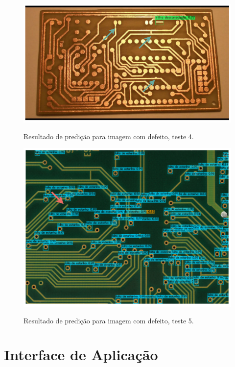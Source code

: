 \begin{figure}[H] %
  \centering
  \caption{Resultado de predição para imagem com defeito, teste 4.}
  \includegraphics[scale=0.95]{img/img-resultados-predicao-ruim-1.pdf}
  \label{fig:resultados-predicao-ruim-1}
\end{figure}

\begin{figure}[!h] %
  \centering
  \caption{Resultado de predição para imagem com defeito, teste 5.}
  \includegraphics[scale=0.95]{img/img-resultados-predicao-ruim-2.pdf}
  \label{fig:resultados-predicao-ruim-2}
\end{figure}

\chapter{Interface de Aplicação} \label{cap:api}
